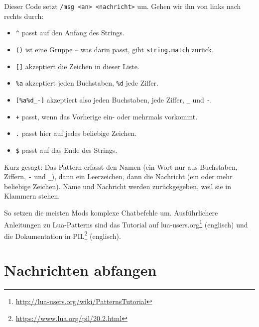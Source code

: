 \begin{Shaded}
\begin{Highlighting}[]
 \OperatorTok{,}  \OperatorTok{=} \OperatorTok{:}\OperatorTok{(}\OperatorTok{)}
\end{Highlighting}
\end{Shaded}

Dieser Code setzt \texttt{/\allowbreak{}msg <an> <nachricht>} um. Gehen
wir ihn von links nach rechts durch:

\begin{itemize}
\tightlist
\item
  \texttt{\textasciicircum{}} passt auf den Anfang des Strings.
\item
  \texttt{()} ist eine Gruppe -- was darin passt,
  gibt \texttt{string.\allowbreak{}match} zurück.
\item
  \texttt{[]} akzeptiert die Zeichen in dieser Liste.
\item
  \texttt{\%a} akzeptiert jeden Buchstaben, \texttt{\%d} jede Ziffer.
\item
  \texttt{[\%a\%d\_\allowbreak{}-]} akzeptiert also jeden Buchstaben,
  jede Ziffer, \texttt{\_\allowbreak{}} und \texttt{-}.
\item
  \texttt{+} passt, wenn das Vorherige ein- oder mehrmals vorkommt.
\item
  \texttt{.\allowbreak{}} passt hier auf jedes beliebige Zeichen.
\item
  \texttt{\$} passt auf das Ende des Strings.
\end{itemize}

Kurz gesagt: Das Pattern erfasst den Namen (ein Wort nur aus Buchstaben,
Ziffern, \texttt{-} und \texttt{\_\allowbreak{}}), dann ein Leerzeichen,
dann die Nachricht (ein oder mehr beliebige Zeichen). Name und Nachricht
werden zurückgegeben, weil sie in Klammern stehen.

So setzen die meisten Mods komplexe Chatbefehle um. Ausführlichere
Anleitungen zu Lua-Patterns sind das Tutorial auf
lua-users.org\footnote{\url{http://lua-users.org/wiki/PatternsTutorial}}
(englisch) und die Dokumentation in PIL\footnote{\url{https://www.lua.org/pil/20.2.html}}
(englisch).

\section{Nachrichten abfangen}\label{nachrichten-abfangen}

